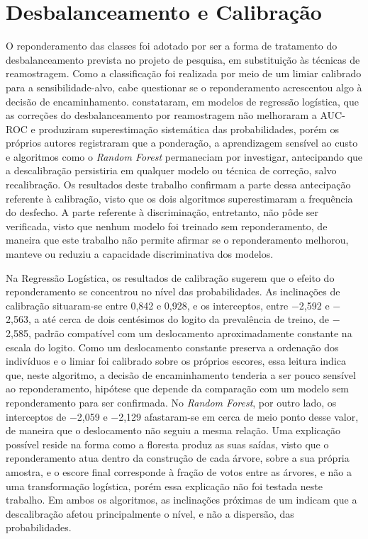 \section{Desbalanceamento e Calibração}\label{sec:disc-calibracao}
O reponderamento das classes foi adotado por ser a forma de tratamento do desbalanceamento prevista no projeto de pesquisa, em substituição às técnicas de reamostragem. Como a classificação foi realizada por meio de um limiar calibrado para a sensibilidade-alvo, cabe questionar se o reponderamento acrescentou algo à decisão de encaminhamento. \textcite{vandengoorbergh2022harm} constataram, em modelos de regressão logística, que as correções do desbalanceamento por reamostragem não melhoraram a AUC-ROC e produziram superestimação sistemática das probabilidades, porém os próprios autores registraram que a ponderação, a aprendizagem sensível ao custo e algoritmos como o \textit{Random Forest} permaneciam por investigar, antecipando que a descalibração persistiria em qualquer modelo ou técnica de correção, salvo recalibração. Os resultados deste trabalho confirmam a parte dessa antecipação referente à calibração, visto que os dois algoritmos superestimaram a frequência do desfecho. A parte referente à discriminação, entretanto, não pôde ser verificada, visto que nenhum modelo foi treinado sem reponderamento, de maneira que este trabalho não permite afirmar se o reponderamento melhorou, manteve ou reduziu a capacidade discriminativa dos modelos.

Na Regressão Logística, os resultados de calibração sugerem que o efeito do reponderamento se concentrou no nível das probabilidades. As inclinações de calibração situaram-se entre 0,842 e 0,928, e os interceptos, entre $-$2,592 e $-$2,563, a até cerca de dois centésimos do logito da prevalência de treino, de $-$2,585, padrão compatível com um deslocamento aproximadamente constante na escala do logito. Como um deslocamento constante preserva a ordenação dos indivíduos e o limiar foi calibrado sobre os próprios escores, essa leitura indica que, neste algoritmo, a decisão de encaminhamento tenderia a ser pouco sensível ao reponderamento, hipótese que depende da comparação com um modelo sem reponderamento para ser confirmada. No \textit{Random Forest}, por outro lado, os interceptos de $-$2,059 e $-$2,129 afastaram-se em cerca de meio ponto desse valor, de maneira que o deslocamento não seguiu a mesma relação. Uma explicação possível reside na forma como a floresta produz as suas saídas, visto que o reponderamento atua dentro da construção de cada árvore, sobre a sua própria amostra, e o escore final corresponde à fração de votos entre as árvores, e não a uma transformação logística, porém essa explicação não foi testada neste trabalho. Em ambos os algoritmos, as inclinações próximas de um indicam que a descalibração afetou principalmente o nível, e não a dispersão, das probabilidades.

